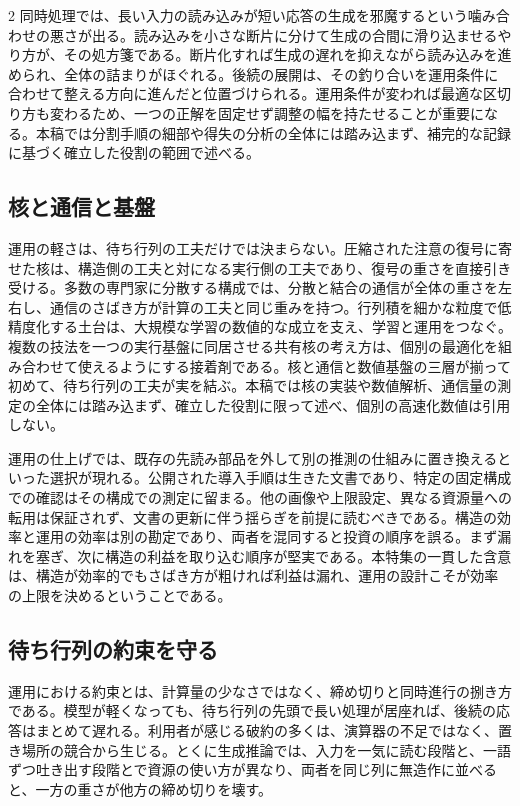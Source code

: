 \documentclass[lualatex,a4paper,10pt]{jlreq}
\begin{document}
\begin{multicols}{2}
同時処理では、長い入力の読み込みが短い応答の生成を邪魔するという噛み合わせの悪さが出る。読み込みを小さな断片に分けて生成の合間に滑り込ませるやり方が、その処方箋である\autocite{sarathi}。断片化すれば生成の遅れを抑えながら読み込みを進められ、全体の詰まりがほぐれる。後続の展開は、その釣り合いを運用条件に合わせて整える方向に進んだと位置づけられる。運用条件が変われば最適な区切り方も変わるため、一つの正解を固定せず調整の幅を持たせることが重要になる。本稿では分割手順の細部や得失の分析の全体には踏み込まず、補完的な記録に基づく確立した役割の範囲で述べる。

\subsection{核と通信と基盤}
運用の軽さは、待ち行列の工夫だけでは決まらない。圧縮された注意の復号に寄せた核は、構造側の工夫と対になる実行側の工夫であり、復号の重さを直接引き受ける\autocite{flashmla}。多数の専門家に分散する構成では、分散と結合の通信が全体の重さを左右し、通信のさばき方が計算の工夫と同じ重みを持つ\autocite{deepep}。行列積を細かな粒度で低精度化する土台は、大規模な学習の数値的な成立を支え、学習と運用をつなぐ\autocite{deepgemm}。複数の技法を一つの実行基盤に同居させる共有核の考え方は、個別の最適化を組み合わせて使えるようにする接着剤である\autocite{flashinfer}。核と通信と数値基盤の三層が揃って初めて、待ち行列の工夫が実を結ぶ。本稿では核の実装や数値解析、通信量の測定の全体には踏み込まず、確立した役割に限って述べ、個別の高速化数値は引用しない。

運用の仕上げでは、既存の先読み部品を外して別の推測の仕組みに置き換えるといった選択が現れる\autocite{dspark}。公開された導入手順は生きた文書であり、特定の固定構成での確認はその構成での測定に留まる\autocite{vllmrecipe}。他の画像や上限設定、異なる資源量への転用は保証されず、文書の更新に伴う揺らぎを前提に読むべきである。構造の効率と運用の効率は別の勘定であり、両者を混同すると投資の順序を誤る。まず漏れを塞ぎ、次に構造の利益を取り込む順序が堅実である。本特集の一貫した含意は、構造が効率的でもさばき方が粗ければ利益は漏れ、運用の設計こそが効率の上限を決めるということである。

\subsection{待ち行列の約束を守る}
運用における約束とは、計算量の少なさではなく、締め切りと同時進行の捌き方である。模型が軽くなっても、待ち行列の先頭で長い処理が居座れば、後続の応答はまとめて遅れる。利用者が感じる破約の多くは、演算器の不足ではなく、置き場所の競合から生じる。とくに生成推論では、入力を一気に読む段階と、一語ずつ吐き出す段階とで資源の使い方が異なり、両者を同じ列に無造作に並べると、一方の重さが他方の締め切りを壊す\autocite{splitwise}\autocite{sarathi}。


\end{multicols}
\end{document}
